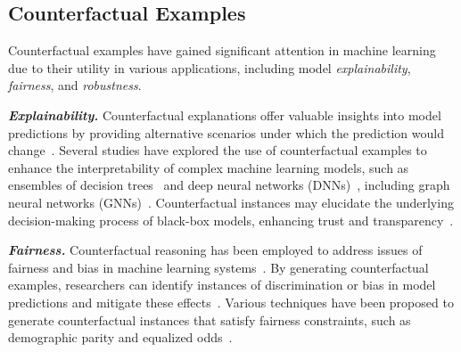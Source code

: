 




\subsection{Counterfactual Examples}
\label{subsec:cf-examples}
Counterfactual examples have gained significant attention in machine learning due to their utility in various applications, including model \textit{explainability}, \textit{fairness}, and \textit{robustness}.

\smallskip
\noindent \textit{\textbf{Explainability.}} Counterfactual explanations offer valuable insights into model predictions by providing alternative scenarios under which the prediction would change~\citep{wachter2017hjlt}. 
Several studies have explored the use of counterfactual examples to enhance the interpretability of complex machine learning models, such as ensembles of decision trees~\citep{tolomei2017kdd,tolomei2021tkde,lucic2022aaai} and deep neural networks (DNNs)~\citep{le2020kdd}, including graph neural networks (GNNs)~\citep{lucic2022aistats}. Counterfactual instances may elucidate the underlying decision-making process of black-box models, enhancing trust and transparency~\citep{guidotti2018arxiv,karimi2020pmlr,chen2022cikm}.


\smallskip
\noindent \textit{\textbf{Fairness.}} Counterfactual reasoning has been employed to address issues of fairness and bias in machine learning systems~\citep{kusner2017neurips}. By generating counterfactual examples, researchers can identify instances of discrimination or bias in model predictions and mitigate these effects~\citep{kamiran2012kis}. Various techniques have been proposed to generate counterfactual instances that satisfy fairness constraints, such as demographic parity and equalized odds~\citep{wachter2017hjlt}.


